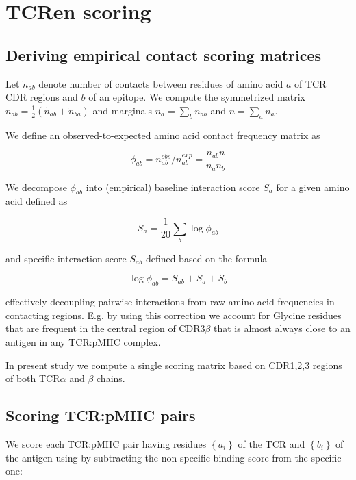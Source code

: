 \documentclass{article}
\begin{document}
\section{TCRen scoring}

\subsection{Deriving empirical contact scoring matrices} 

Let $\tilde{n}_{ab}$ denote number of contacts between residues of amino acid $a$ of TCR CDR regions and $b$ of an epitope. We compute the symmetrized matrix $n_{ab} = \frac{1}{2} \left(\tilde{n}_{ab} + \tilde{n}_{ba}\right)$ and marginals $n_a = \sum_{b} n_{ab}$ and $n = \sum_a n_{a}$.

We define an observed-to-expected amino acid contact frequency matrix as

\begin{equation}
\phi_{ab} = n^{obs}_{ab} /  n^{exp}_{ab} = \frac{n_{ab} n}{n_a n _b}
\end{equation}

We decompose $\phi_{ab}$ into (empirical) baseline interaction score $S_{a}$ for a given amino acid defined as

\begin{equation}
S_{a} = \frac{1}{20} \sum_{b} \log \phi_{ab}
\end{equation}

and specific interaction score $S_{ab}$ defined based on the formula

\begin{equation}
\log \phi_{ab}= S_{ab} + S_{a} + S_{b}
\end{equation}

effectively decoupling pairwise interactions from raw amino acid frequencies in contacting regions. E.g. by using this correction we account for Glycine residues that are frequent in the central region of CDR3$\beta$ that is almost always close to an antigen in any TCR:pMHC complex.

In present study we compute a single scoring matrix based on CDR1,2,3 regions of both TCR$\alpha$ and $\beta$ chains.

\subsection{Scoring TCR:pMHC pairs}

We score each TCR:pMHC pair having residues $\left\{a_i\right\}$ of the TCR and $\left\{b_i\right\}$ of the antigen using by subtracting the non-specific binding score from the specific one:
\end{document}
